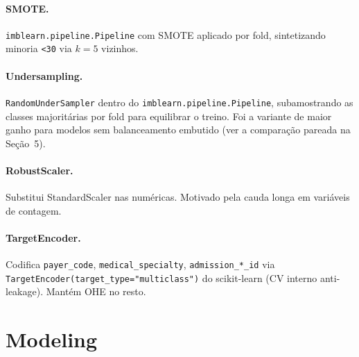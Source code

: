 \documentclass[12pt,a4paper]{article}
\begin{document}
\paragraph{SMOTE.} \texttt{imblearn.pipeline.Pipeline} com SMOTE aplicado por fold, sintetizando minoria \texttt{<30} via $k=5$ vizinhos.
\paragraph{Undersampling.} \texttt{RandomUnderSampler} dentro do \texttt{imblearn.pipeline.Pipeline}, subamostrando as classes majoritárias por fold para equilibrar o treino. Foi a variante de maior ganho para modelos sem balanceamento embutido (ver a comparação pareada na Seção~5).
\paragraph{RobustScaler.} Substitui StandardScaler nas numéricas. Motivado pela cauda longa em variáveis de contagem.
\paragraph{TargetEncoder.} Codifica \texttt{payer\_code}, \texttt{medical\_specialty}, \texttt{admission\_*\_id} via \texttt{TargetEncoder(target\_type="multiclass")} do scikit-learn (CV interno anti-leakage). Mantém OHE no resto.

\section{Modeling}
\end{document}
